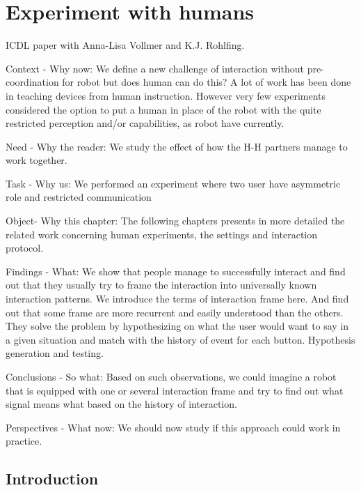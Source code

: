 \renewcommand{\chapterpath}{\allchapterspath/humanexperiment}
\renewcommand{\imgpath}{\chapterpath/img}

\chapter{Experiment with humans}
\label{chapter:humanexperiment}
\minitoc

ICDL paper with Anna-Lisa Vollmer and K.J. Rohlfing.

Context - Why now: We define a new challenge of interaction without pre-coordination for robot but does human can do this? A lot of work has been done in teaching devices from human instruction. However very few experiments considered the option to put a human in place of the robot with the quite restricted perception and/or capabilities, as robot have currently.

Need - Why the reader: We study the effect of how the H-H partners manage to work together.

Task - Why us: We performed an experiment where two user have asymmetric role and restricted communication

Object- Why this chapter: The following chapters presents in more detailed the related work concerning human experiments, the settings and interaction protocol.

Findings - What: We show that people manage to successfully interact and find out that they usually try to frame the interaction into universally known interaction patterns. We introduce the terms of interaction frame here. And find out that some frame are more recurrent and easily understood than the others. They solve the problem by hypothesizing on what the user would want to say in a given situation and match with the history of event for each button. Hypothesis generation and testing.

Conclusions - So what: Based on such observations, we could imagine a robot that is equipped with one or several interaction frame and try to find out what signal means what based on the history of interaction.

Perspectives - What now: We should now study if this approach could work in practice.

\section{Introduction}

